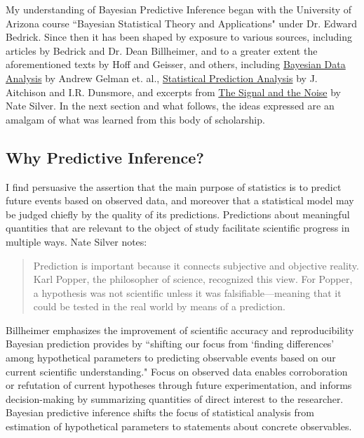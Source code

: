 \documentclass[12pt, a4paper]{article}
\begin{document}
My understanding of Bayesian Predictive Inference began with the University of Arizona course ``Bayesian Statistical Theory and Applications" under Dr. Edward Bedrick.  Since then it has been shaped by exposure to various sources, including articles by Bedrick and Dr. Dean Billheimer, and to a greater extent the aforementioned texts by Hoff and Geisser, and others, including \underline{Bayesian Data Analysis} by Andrew Gelman et. al., \underline{Statistical Prediction Analysis} by J. Aitchison and I.R. Dunsmore, and excerpts from \underline{The Signal and the Noise} by Nate Silver.  In the next section and what follows, the ideas expressed are an amalgam of what was learned from this body of scholarship.

  \subsection{Why Predictive Inference?}


I find persuasive the assertion that the main purpose of statistics is to predict future events based on observed data, and moreover that a statistical model may be judged chiefly by the quality of its predictions.  Predictions about meaningful quantities that are relevant to the object of study facilitate scientific progress in multiple ways.  Nate Silver notes:

\begin{quote}
Prediction is important because it connects subjective and objective reality. Karl Popper, the philosopher of science, recognized this view. For Popper, a hypothesis was not scientific unless it was falsifiable—meaning that it could be tested in the real world by means of a prediction.
\end{quote}

\noindent Billheimer emphasizes the improvement of scientific accuracy and reproducibility Bayesian prediction provides by ``shifting our focus from `finding differences' among hypothetical parameters to predicting observable events based on our current scientific understanding."  Focus on observed data enables corroboration or refutation of current hypotheses through future experimentation, and informs decision-making by summarizing quantities of direct interest to the researcher.  Bayesian predictive inference shifts the focus of statistical analysis from estimation of hypothetical parameters to statements about concrete observables.\\
\end{document}
